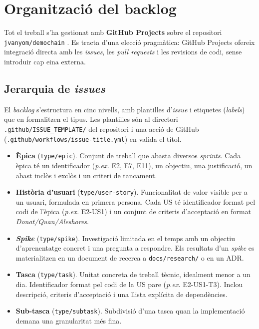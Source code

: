 \section{Organització del backlog}
\label{sec:backlog}

Tot el treball s'ha gestionat amb \textbf{GitHub Projects} sobre el
repositori \texttt{jvanyom/demochain} \cite{demochainrepo}. Es tracta d'una
elecció pragmàtica: GitHub Projects ofereix integració directa amb les
\emph{issues}, les \emph{pull requests} i les revisions de codi, sense
introduir cap eina externa.

\subsection{Jerarquia de \emph{issues}}
\label{sec:jerarquia}

El \emph{backlog} s'estructura en cinc nivells, amb plantilles d'\emph{issue}
i etiquetes (\emph{labels}) que en formalitzen el tipus. Les plantilles són
al directori \texttt{.github/ISSUE\_TEMPLATE/} del repositori i una acció de
GitHub (\texttt{.github/workflows/issue-title.yml}) en valida el títol.

\begin{itemize}
    \item \textbf{Èpica} (\texttt{type/epic}). Conjunt de treball que abasta
    diversos \emph{sprints}. Cada èpica té un identificador (\emph{p.ex.}
    E2, E7, E11), un objectiu, una justificació, un abast inclòs i exclòs i
    un criteri de tancament.

    \item \textbf{Història d'usuari} (\texttt{type/user-story}). Funcionalitat
    de valor visible per a un usuari, formulada en primera persona. Cada
    \ac{US} té identificador format pel codi de l'èpica (\emph{p.ex.}
    E2-US1) i un conjunt de criteris d'acceptació en format
    \emph{Donat/Quan/Aleshores}.

    \item \textbf{\emph{Spike}} (\texttt{type/spike}). Investigació limitada
    en el temps amb un objectiu d'aprenentatge concret i una pregunta a
    respondre. Els resultats d'un \emph{spike} es materialitzen en un
    document de recerca a \texttt{docs/research/} o en un \ac{ADR}.

    \item \textbf{Tasca} (\texttt{type/task}). Unitat concreta de treball
    tècnic, idealment menor a un dia. Identificador format pel codi de la
    \ac{US} pare (\emph{p.ex.} E2-US1-T3). Inclou descripció, criteris
    d'acceptació i una llista explícita de dependències.

    \item \textbf{Sub-tasca} (\texttt{type/subtask}). Subdivisió d'una tasca
    quan la implementació demana una granularitat més fina.
\end{itemize}

